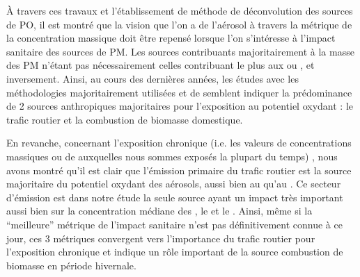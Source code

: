 À travers ces travaux et l'établissement de méthode de déconvolution des sources de PO, il
est montré que la vision que l'on a de l'aérosol à travers la métrique de la
concentration massique doit être repensé lorsque l'on s'intéresse à l'impact sanitaire
des sources de PM. Les sources contribuants majoritairement à la masse des PM n'étant pas
nécessairement celles contribuant le plus aux \POAA{} ou \PODTT, et inversement.
Ainsi, au cours des dernières années, les études avec les méthodologies majoritairement utilisées \POAA{} et \PODTT{} de
\cite{vermaReactive2014,batesReactive2015,fangOxidative2016,weberApportionment2018,cesariSource2019,daellenbachSourcessubmitted,weberSourceinprep.}
semblent indiquer la prédominance de 2 sources anthropiques majoritaires pour l'exposition
au potentiel oxydant : le trafic routier et la combustion de biomasse domestique.

En revanche, concernant l'exposition chronique (i.e. les valeurs de concentrations massiques ou de \POv{} auxquelles nous sommes exposés la plupart du temps)
, nous avons montré qu'il est clair que
l'émission primaire du trafic routier est la source majoritaire du potentiel oxydant des
aérosols, aussi bien au \POAA{} qu'au \PODTT. Ce secteur d'émission est dans notre étude
la seule source ayant un impact très important aussi bien sur la concentration médiane des
\PMdix{}, le \POAAv{} et le \PODTTv.
Ainsi, même si la ``meilleure'' métrique de l'impact sanitaire n'est pas définitivement
connue à ce jour, ces 3 métriques convergent vers l'importance du trafic routier pour l'exposition chronique et indique un rôle important de la source combustion de biomasse en période hivernale.

